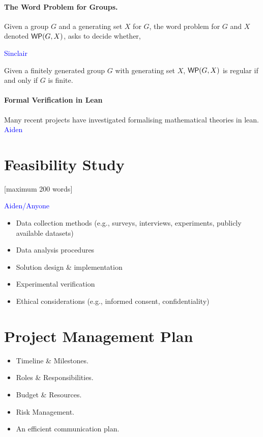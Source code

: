 \documentclass[12pt]{article}
\begin{document}
\paragraph{The Word Problem for Groups.} Given a group $G$ and a generating set $X$ for $G$, the word problem for $G$ and $X$ denoted $\textsf{WP}(G,X)$, asks to decide whether,

\textcolor{blue}{Sinclair}

\begin{theorem}\label{thm:finite-groups-dfa-wp}
  Given a finitely generated group $G$ with generating set $X$, $\textsf{WP}(G,X)$ is regular if and only if $G$ is finite.
\end{theorem}

\paragraph{Formal Verification in Lean} Many recent projects have investigated formalising mathematical theories in lean.
\textcolor{blue}{Aiden}

\section{Feasibility Study}
[maximum 200 words]
\newline

\textcolor{Feasibility study in terms of computing \& time resources, team’s capability, and skill sets.}

\textcolor{blue}{Aiden/Anyone}

\begin{itemize}
    \item Data collection methods (e.g., surveys, interviews, experiments, publicly available datasets)
    \item Data analysis procedures
    \item Solution design \& implementation
    \item Experimental verification
    \item Ethical considerations (e.g., informed consent, confidentiality)
\end{itemize}


\section{Project Management Plan}


\begin{itemize}
    \item Timeline \& Milestones.
    \item Roles \& Responsibilities.
    \item Budget \& Resources.
    \item Risk Management.
    \item An efficient communication plan.
\end{itemize}
\end{document}
